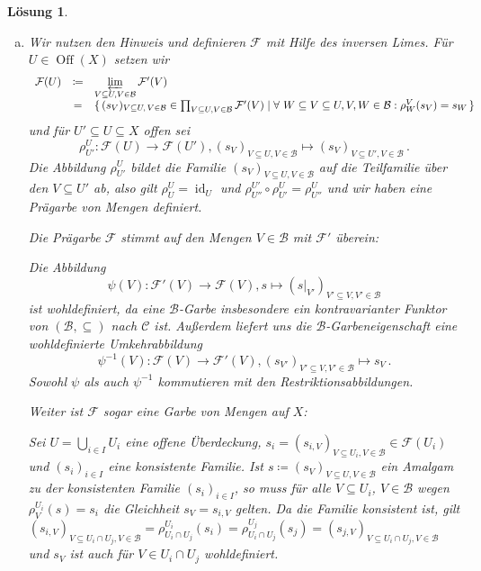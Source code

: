 \documentclass[paper = A4, fontsize=12pt, numbers=noendperiod, chapterprefix=true]{scrbook}
\theoremstyle{break}
\newtheorem{Loes}{L\"osung}
\theoremstyle{nonumberbreak}
\theoremstyle{nonumberplain}
\DeclareMathOperator{\Off}{Off}
\DeclareMathOperator{\id}{id}
\newcommand{\F}{\mathcal{F}} %
\begin{document}
\begin{Loes}
\begin{enumerate}[a)]%
 \item Wir nutzen den Hinweis und definieren $\F$ mit Hilfe des inversen Limes. F\"ur $U \in \Off(X)$ setzen wir 
 $$\begin{array}{rcl}
    \F(U) &\coloneqq& \varprojlim\limits_{V \subseteq U, V \in \mathcal{B}} \F'(V) \\
    &=& \{ \, (s_V)_{V \subseteq U, \, V \in \mathcal{B}} \in \prod_{V \subseteq U, V \in \mathcal{B}} \F'(V) \mid \forall\  W \subseteq V \subseteq U, V,W \in \mathcal{B}: \rho^V_W(s_V) = s_W \, \}
   \end{array}
$$
und f\"ur $U' \subseteq U \subseteq X$ offen sei
$$
\rho^U_{U'} \colon \F(U) \to \F(U'), (s_V)_{V \subseteq U, V \in \mathcal{B}} \mapsto (s_V)_{V \subseteq U', V \in \mathcal{B}}\,.
$$
Die Abbildung $\rho^U_{U'}$ bildet die Familie $(s_V)_{V \subseteq U, V \in \mathcal{B}}$ auf die Teilfamilie \"uber den $V \subseteq U'$ ab, also gilt $\rho^U_U = \id_U$ und $\rho^{U'}_{U''} \circ \rho^U _ {U'} = \rho^U_{U''}$
und wir haben eine Pr\"agarbe von Mengen definiert.

Die Pr\"agarbe $\F$ stimmt auf den Mengen $V \in \mathcal{B}$ mit $\F'$ \"uberein: 

Die Abbildung
$$
\psi(V)\colon \F'(V) \to \F(V), s \mapsto (s|_{V'})_{V' \subseteq V, V' \in \mathcal{B}}
$$
ist wohldefiniert, da eine $\mathcal{B}$-Garbe insbesondere ein kontravarianter Funktor von $(\mathcal{B}, \subseteq)$ nach $\mathcal{C}$ ist. Au\ss erdem liefert uns die $\mathcal{B}$-Garbeneigenschaft eine wohldefinierte Umkehrabbildung
$$
\psi^{-1}(V)\colon \F(V) \to \F'(V),  (s_{V'})_{V' \subseteq V, V' \in \mathcal{B}} \mapsto s_V\,.
$$
Sowohl $\psi$ als auch $\psi^{-1}$ kommutieren mit den Restriktionsabbildungen.

Weiter ist $\F$ sogar eine Garbe von Mengen auf $X$:

Sei $U = \bigcup_{i \in I} U_i$ eine offene \"Uberdeckung, $s_i = (s_{i,V} )_{V \subseteq U_i, V \in \mathcal{B}} \in \F(U_i)$ und $(s_i)_{i\in I}$ eine konsistente Familie. 
Ist $s \coloneqq (s_V)_{V \subseteq U, V \in \mathcal{B}}$  ein Amalgam zu der konsistenten Familie $(s_i)_{i \in I}$, so muss f\"ur alle $V \subseteq U_i$, $V \in \mathcal{B}$ wegen $\rho^{U_i}_V(s) = s_i$ die Gleichheit $s_V = s_{i,V}$ gelten. Da die Familie konsistent ist, gilt $(s_{i,V})_{V \subseteq U_i\cap U_j, V \in \mathcal{B}} = \rho^{U_i}_{U_i \cap U_j}(s_i) = \rho^{U_j}_{U_i \cap U_j}(s_j) = (s_{j,V} )_{V \subseteq U_i\cap U_j, V \in \mathcal{B}}$ und $s_V$ ist auch f\"ur $V \in U_i \cap U_j$ wohldefiniert. 


\end{enumerate}
\end{Loes}
\end{document}
